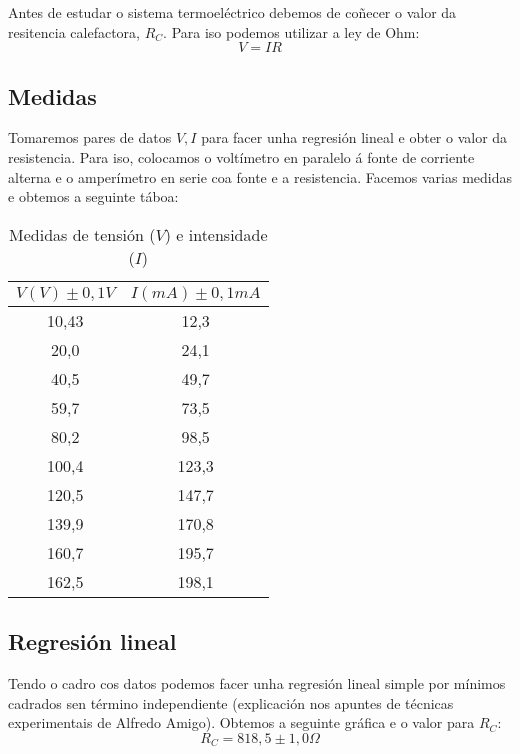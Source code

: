 \documentclass[12pt, a4paper, titlepage]{article}
\begin{document}
  Antes de estudar o sistema termoeléctrico debemos de coñecer o valor da resitencia calefactora, $R_C$.
  Para iso podemos utilizar a ley de Ohm:
  \begin{equation}
    V = IR
    \label{ec:ley_ohm}
  \end{equation}

  \subsection{Medidas}

  Tomaremos pares de datos $V, I$ para facer unha regresión lineal e obter o valor da resistencia.
  Para iso, colocamos o voltímetro en paralelo á fonte de corriente alterna e o amperímetro en serie coa fonte e a resistencia.
  Facemos varias medidas e obtemos a seguinte táboa:

  \begin{table}[H]
    \centering
    \begin{tabular}{|c|c|}
    \hline
    $V(V) \pm 0,1 V$ & $I(mA) \pm 0,1 mA$ \\ \hline
    10,43            & 12,3               \\ \hline
    20,0             & 24,1               \\ \hline
    40,5             & 49,7               \\ \hline
    59,7             & 73,5               \\ \hline
    80,2             & 98,5               \\ \hline
    100,4            & 123,3              \\ \hline
    120,5            & 147,7              \\ \hline
    139,9            & 170,8              \\ \hline
    160,7            & 195,7              \\ \hline
    162,5            & 198,1              \\ \hline
    \end{tabular}
    \caption{Medidas de tensión ($V$) e intensidade ($I$)}
  \end{table}

  \subsection{Regresión lineal}

  Tendo o cadro cos datos podemos facer unha regresión lineal simple por mínimos cadrados sen término independiente (explicación nos apuntes de técnicas experimentais de Alfredo Amigo).
  Obtemos a seguinte gráfica e o valor para $R_C$:
  \begin{equation}
    R_C = 818,5 \pm 1,0 \Omega
    \label{ec:resistencia}
  \end{equation}
\end{document}
